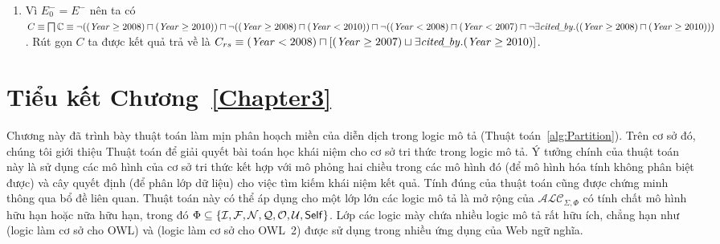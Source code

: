 \begin{Example}
\begin{enumerate}
		\item Vì $E^-_0 = E^-$ nên ta có $C \equiv \bigsqcap\mathbb{C} \equiv \neg((\mathit{Year} \geq 2008) \sqcap (\mathit{Year} \geq 2010)) \sqcap \neg((\mathit{Year} \geq 2008) \sqcap (\mathit{Year} < 2010)) \sqcap \neg((\mathit{Year} < 2008) \sqcap (\mathit{Year} < 2007) \sqcap \neg\exists\mathit{cited\!\_\!by}.((\mathit{Year} \geq 2008) \sqcap (\mathit{Year} \geq 2010)))$. Rút gọn $C$ ta được kết quả trả về là $C_{rs} \equiv (\mathit{Year} < 2008) \sqcap [(\mathit{Year} \geq 2007) \sqcup \exists\mathit{cited\!\_\!by}.(\mathit{Year} \geq 2010)]$.\myend
	\end{enumerate}
\end{Example}

\section*{Tiểu kết Chương~\ref{Chapter3}}
\label{sec:Chap3.Summary}
Chương này đã trình bày thuật toán làm mịn phân hoạch miền của diễn dịch trong logic mô tả (Thuật toán~\ref{alg:Partition}). Trên cơ sở đó, chúng tôi giới thiệu Thuật toán \BBCLearnS để giải quyết bài toán học khái niệm cho cơ sở tri thức trong logic mô tả. 
Ý tưởng chính của thuật toán này là sử dụng các mô hình của cơ sở tri thức kết hợp với mô phỏng hai chiều trong các mô hình đó (để mô hình hóa tính không phân biệt được) và cây quyết định (để phân lớp dữ liệu) cho việc tìm kiếm khái niệm kết quả. Tính đúng của thuật toán \BBCLearnS cũng được chứng minh thông qua bổ đề liên quan.
Thuật toán này có thể áp dụng cho một lớp lớn các logic mô tả là mở rộng của $\mathcal{ALC}_{\Sigma,\Phi}$ có tính chất mô hình hữu hạn hoặc nữa hữu hạn, trong đó $\Phi \subseteq \{\mathcal{I}, \mathcal{F}, \mathcal{N}, \mathcal{Q}, \mathcal{O}, \mathcal{U}, \mathsf{Self}\}$. Lớp các logic mày chứa nhiều logic mô tả rất hữu ích, chẳng hạn như \SHIQ (logic làm cơ sở cho OWL) và \SROIQ (logic làm cơ sở cho OWL~2) được sử dụng trong nhiều ứng dụng của Web ngữ nghĩa.
\cleardoublepage
